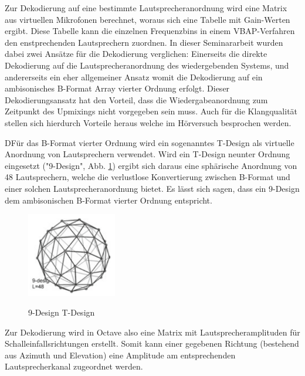 Zur Dekodierung auf eine bestimmte Lautsprecheranordnung wird eine Matrix aus virtuellen Mikrofonen berechnet, woraus sich eine Tabelle mit Gain-Werten ergibt. Diese Tabelle kann die einzelnen Frequenzbins in einem VBAP-Verfahren den enstprechenden Lautsprechern zuordnen. In dieser Seminararbeit wurden dabei zwei Ansätze für die Dekodierung verglichen: Einerseits die direkte Dekodierung auf die Lautsprecheranordnung des wiedergebenden Systems, und andererseits ein eher allgemeiner Ansatz womit die Dekodierung auf ein ambisonisches B-Format Array vierter Ordnung erfolgt. Dieser Dekodierungsansatz hat den Vorteil, dass die Wiedergabeanordnung zum Zeitpunkt des Upmixings nicht vorgegeben sein muss. Auch für die Klangqualität stellen sich hierdurch Vorteile heraus welche im Hörversuch besprochen werden.

DFür das B-Format vierter Ordnung wird ein sogenanntes T-Design als virtuelle Anordnung von Lautsprechern verwendet. Wird ein T-Design neunter Ordnung eingesetzt ("9-Design", Abb. \ref{fig:tdesign}) ergibt sich daraus eine sphärische Anordnung von 48 Lautsprechern, welche die verlustlose Konvertierung zwischen B-Format und einer solchen Lautsprecheranordnung bietet. Es lässt sich sagen, dass ein 9-Design dem ambisonischen B-Format vierter Ordnung entspricht.

\begin{figure}[!ht]
  \centering
  \includegraphics[width=0.35\textwidth]{implementierung/plots/t-design.png}
  \label{fig:tdesign}
  \caption{9-Design T-Design\protect\footnotemark}
\end{figure}


Zur Dekodierung wird in Octave also eine Matrix mit Lautsprecheramplituden für Schalleinfallsrichtungen erstellt. Somit kann einer gegebenen Richtung (bestehend aus Azimuth und Elevation) eine Amplitude am entsprechenden Lautsprecherkanal zugeordnet werden.
